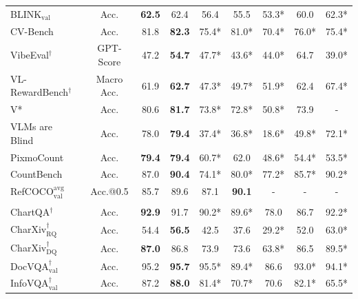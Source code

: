 \begin{table}[htbp]
{\begin{tabular}{l c | S[table-format=2.1] S[table-format=2.1] | S[table-format=2.1] S[table-format=2.1] S[table-format=2.1] | S[table-format=2.1] S[table-format=2.1]}
    BLINK$_{\mathrm{val}}$                &  Acc.        &  \textbf{62.5} & 62.4 & 56.4  & 55.5  & 53.3* &  60.0  &  62.3*               \\ 
    CV-Bench                              & Acc.         &  81.8 & \textbf{82.3} & 75.4* & 81.0* & 70.4* &  76.0* & 75.4* \\ 
    VibeEval$^{\dag}$                      &  GPT-Score   & 47.2  & \textbf{54.7} & 47.7* & 43.6* & 44.0* & 64.7  &  39.0*               \\ 
    VL-RewardBench$^{\dag}$                &  Macro Acc.  &  61.9 & \textbf{62.7} & 47.3* & 49.7* & 51.9* &  62.4  & 67.4*                \\ 
    V* &  Acc.        &  80.6 & \textbf{81.7} & 73.8* & 72.8* & 50.8* &  73.9  &  {-}               \\  
    VLMs are Blind                        &  Acc.        & 78.0  & \textbf{79.4} & 37.4* & 36.8* &  18.6*     &   49.8*   &  72.1*               \\ 
    PixmoCount                            &  Acc.        &  \textbf{79.4} & \textbf{79.4} & 60.7* & 62.0  &   48.6*    &    54.4*  &  53.5*               \\ 
    CountBench                            &  Acc.        & 87.0  & \textbf{90.4} & 74.1* & 80.0* & 77.2*  &   85.7* &  90.2*               \\ 
    RefCOCO$_{\mathrm{val}}^\mathrm{avg}$              &  Acc.@0.5    & 85.7  & 89.6  & 87.1  & \textbf{90.1} &   {-}    &  {-}      &   {-}              \\  
    \midrule
     \\ %
    ChartQA$^{\dag}$                      &  Acc.        & \textbf{92.9} & 91.7  & 90.2* & 89.6* & 78.0  &  86.7  & 92.2*                 \\
    CharXiv$_{\mathrm{RQ}}^{\dag}$        &  Acc.        & 54.4  & \textbf{56.5} & 42.5  & 37.6  &  29.2*     &  52.0 &   63.0*              \\
    CharXiv$_{\mathrm{DQ}}^{\dag}$        &  Acc.        &  \textbf{87.0} & 86.8  & 73.9  & 73.6  &   63.8*    &  86.5  &   89.5*              \\
    DocVQA$_{\mathrm{val}}^{\dag}$        &  Acc.        &  95.2 &   \textbf{95.7}    & 95.5* & 89.4* & 86.6  &    93.0*    &   94.1*              \\
    InfoVQA$_{\mathrm{val}}^{\dag}$       &  Acc.        & 87.2  & \textbf{88.0} & 81.4* & 70.7* & 70.6  &  82.1*  &    65.5*             \\

\end{tabular}}
\end{table}
